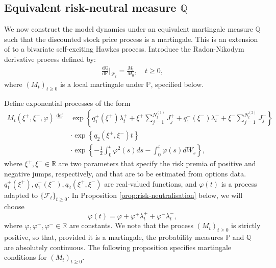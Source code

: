 \documentclass[11pt,a4paper]{article}
\numberwithin{equation}{section}
\theoremstyle{remark}
\theoremstyle{definition}
\providecommand{\R}{{\mathbb{R}}}
\begin{document}
\subsection{Equivalent risk-neutral measure $\mathbb{Q}$}\label{sec:Q}

We now construct the model dynamics under an equivalent martingale measure $\mathbb{Q}$ such that the discounted stock
price process is a martingale. This is an extension of \citep{hainaut2018hedging} to a bivariate self-exciting Hawkes process.
Introduce the Radon-Nikodym derivative process defined by:
\begin{align}
  \frac{\text{d}\mathbb{Q}}{\text{d}\mathbb{P}}\Big|_{\mathcal{F}_t} = \frac{M_t}{M_0},\quad t\geq 0,
\end{align}
where $(M_t)_{t\geq 0}$ is a local martingale under $\mathbb{P}$, specified below.

Define exponential processes of the form
\begin{equation}\label{eq:RD}
\begin{split}
  M_t\left(\xi^+, \xi^-, \varphi\right) \overset{\text{def}}=
  &\exp\left\{
  q^+_1(\xi^+)\lambda^+_t + \xi^+\sum_{j=1}^{N_t^{(1)}}J^+_j
      + q^-_1(\xi^-)\lambda^-_t + \xi^-\sum_{j=1}^{N_t^{(2)}}J^-_j
  \right\} \\
  &\cdot \exp \left\{
  q_2\left(\xi^+, \xi^-\right)t
  \right\}\\
  &\cdot \exp \left\{
  -\frac{1}{2}\int_0^t \varphi^2(s)ds -
  \int_0^t \varphi(s)dW_s
  \right\},
  \end{split}
\end{equation}
where $\xi^+, \xi^- \in \mathbb{R}$ are two parameters that specify the risk premia of positive and negative jumps, respectively, and that are to be estimated from options data. $q_1^+(\xi^+), q_1^-(\xi^-), q_2(\xi^+, \xi^-)$ are  real-valued functions, and $\varphi(t)$ is a process adapted to $\{\mathcal{F}_t\}_{t\geq 0}$.
In Proposition \ref{prop:risk-neutralisation} below, we will choose
\begin{equation}
\varphi(t)=\varphi + \varphi^+\lambda_t^+ + \varphi^-\lambda_t^-,
\end{equation}
where $\varphi, \varphi^+, \varphi^-\in \R$ are constants.
We note that the process $(M_t)_{t\geq 0}$ is strictly positive, so that, provided it is a martingale, the probability measures $\mathbb P$ and $\mathbb Q$ are absolutely continuous.
The following proposition specifies martingale conditions for $(M_t)_{t\geq 0}$.
\end{document}

